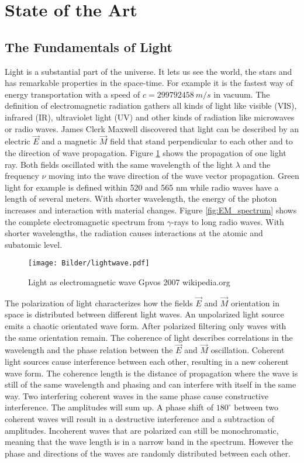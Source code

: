 \section{State of the Art}\label{chap:standdertechnik}
\subsection{The Fundamentals of Light}
Light is a substantial part of the universe. It lets us see the world, the stars and has remarkable properties in the space-time. For example it is the fastest way of energy transportation with a speed of $c = 299792458~m/s$ in vacuum. The definition of electromagnetic radiation gathers all kinds of light like visible (VIS), infrared (IR), ultraviolet light (UV) and other kinds of radiation like microwaves or radio waves. James Clerk Maxwell discovered that light can be described by an electric $\vec{E}$ and a magnetic $\vec{M}$ field that stand perpendicular to each other and to the direction of wave propagation. Figure \ref{fig:LightasWave} shows the propagation of one light ray. Both fields oscillated with the same wavelength of the light $\lambda$ and the frequency $\nu$ moving into the wave direction of the wave vector propagation. Green light for example is defined within 520 and 565 nm while radio waves have a length of several meters. With shorter wavelength, the energy of the photon increases and interaction with material changes. Figure \ref{fig:EM_spectrum} shows the complete electromagnetic spectrum from $\gamma$-rays to long radio waves. With shorter wavelengths, the radiation causes interactions at the atomic and subatomic level.
\begin{figure}[!h]
	\centering  
	\texttt{[image: Bilder/lightwave.pdf]}
	\caption{Light as electromagnetic wave \tiny Gpvos 2007 wikipedia.org \ccbysa }
	\label{fig:LightasWave}
\end{figure}
 
 The polarization of light characterizes how the fields $\vec{E}$ and $\vec{M}$ orientation in space is distributed between different light waves. An unpolarized light source emits a chaotic orientated wave form. After polarized filtering only waves with the same orientation remain. The coherence of light describes correlations in the wavelength and the phase relation between the $\vec{E}$ and $\vec{M}$ oscillation. Coherent light sources cause interference between each other, resulting in a new coherent wave form. The coherence length is the distance of propagation where the wave is still of the same wavelength and phasing and can interfere with itself in the same way. Two interfering coherent waves in the same phase cause constructive interference. The amplitudes will sum up. A phase shift of $180^\circ$ between two coherent waves will result in a destructive interference and a subtraction of amplitudes. Incoherent waves that are polarized can still be monochromatic, meaning that the wave length is in a narrow band in the spectrum. However the phase and directions of the waves are randomly distributed between each other. 

